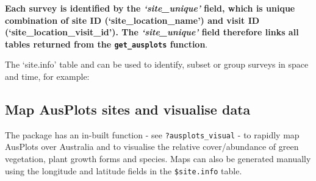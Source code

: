 \documentclass[
]{article}
\newenvironment{Shaded}{\begin{snugshade}}{\end{snugshade}}
\newcommand{\CommentTok}[1]{\textcolor[rgb]{0.56,0.35,0.01}{\textit{#1}}}
\newcommand{\KeywordTok}[1]{\textcolor[rgb]{0.13,0.29,0.53}{\textbf{#1}}}
\newcommand{\NormalTok}[1]{#1}
\newcommand{\OperatorTok}[1]{\textcolor[rgb]{0.81,0.36,0.00}{\textbf{#1}}}
\newcommand{\StringTok}[1]{\textcolor[rgb]{0.31,0.60,0.02}{#1}}
\begin{document}
\begin{Shaded}
\end{Shaded}

\textbf{Each survey is identified by the \emph{`site\_unique'} field,
which is unique combination of site ID (`site\_location\_name') and
visit ID (`site\_location\_visit\_id'). The \emph{`site\_unique'} field
therefore links all tables returned from the \texttt{get\_ausplots}
function}.

The `site.info' table and can be used to identify, subset or group
surveys in space and time, for example:

\begin{Shaded}
\end{Shaded}

\hypertarget{map-ausplots-sites-and-visualise-data}{%
\subsection{Map AusPlots sites and visualise
data}\label{map-ausplots-sites-and-visualise-data}}

The package has an in-built function - see \texttt{?ausplots\_visual} -
to rapidly map AusPlots over Australia and to visualise the relative
cover/abundance of green vegetation, plant growth forms and species.
Maps can also be generated manually using the longitude and latitude
fields in the \texttt{\$site.info} table.
\end{document}
